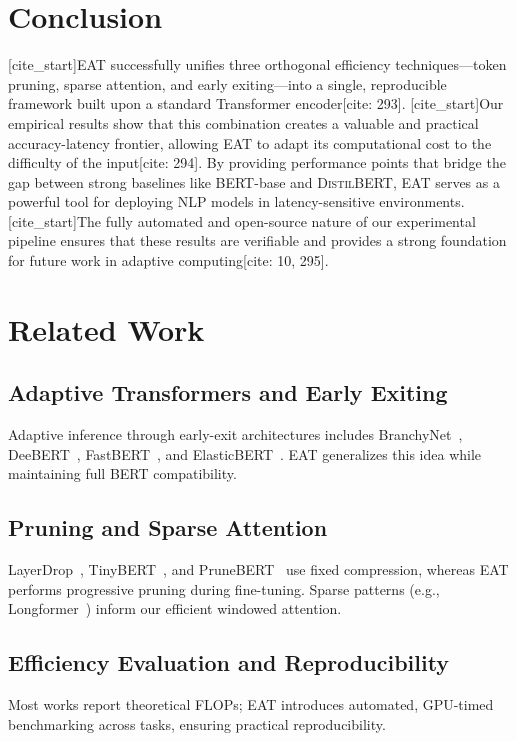 \documentclass[11pt,letterpaper]{article}
\theoremstyle{plain}
\newcommand{\eat}{\textsc{EAT}}
\newcommand{\bert}{\textsc{BERT}}
\newcommand{\distilbert}{\textsc{DistilBERT}}
\begin{document}
\section{Conclusion}
\label{sec:conclusion}
[cite_start]\eat{} successfully unifies three orthogonal efficiency techniques---token pruning, sparse attention, and early exiting---into a single, reproducible framework built upon a standard Transformer encoder[cite: 293]. [cite_start]Our empirical results show that this combination creates a valuable and practical accuracy-latency frontier, allowing \eat{} to adapt its computational cost to the difficulty of the input[cite: 294]. By providing performance points that bridge the gap between strong baselines like \bert{}-base and \distilbert{}, \eat{} serves as a powerful tool for deploying NLP models in latency-sensitive environments. [cite_start]The fully automated and open-source nature of our experimental pipeline ensures that these results are verifiable and provides a strong foundation for future work in adaptive computing[cite: 10, 295].

\section{Related Work}
\subsection{Adaptive Transformers and Early Exiting}
Adaptive inference through early-exit architectures includes BranchyNet~\cite{teerapittayanon2016branchynet}, DeeBERT~\cite{xin2020deebert}, FastBERT~\cite{liu2020fastbert}, and ElasticBERT~\cite{chen2021elasticbert}.
\eat{} generalizes this idea while maintaining full \bert{} compatibility.
\subsection{Pruning and Sparse Attention}
LayerDrop~\cite{fan2019layerdrop}, TinyBERT~\cite{jiao2020tinybert}, and PruneBERT~\cite{gordon2020compressing} use fixed compression, whereas \eat{} performs progressive pruning during fine-tuning.
Sparse patterns (e.g., Longformer~\cite{beltagy2020longformer}) inform our efficient windowed attention.

\subsection{Efficiency Evaluation and Reproducibility}
Most works report theoretical FLOPs;
\eat{} introduces automated, GPU-timed benchmarking across tasks, ensuring practical reproducibility.
\end{document}

